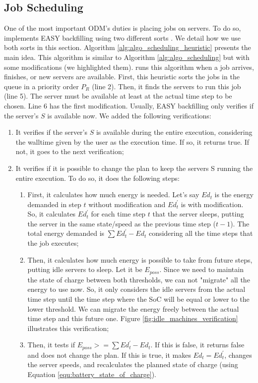\subsection{Job Scheduling}
\label{sec:model_easy}

One of the most important ODM's duties is placing jobs on servers. To do so, \emph{\systemName} implements EASY backfilling using two different sorts \cite{mu2001utilization, lelong2018tuning}. We detail how we use both sorts in this section. Algorithm \ref{alg:algo_scheduling_heuristic} presents the main idea. This algorithm is similar to Algorithm \ref{alg:algo_scheduling} but with some modifications (we highlighted them). \emph{\systemName} runs this algorithm when a job arrives, finishes, or new servers are available. First, this heuristic sorts the jobs in the queue in a priority order $P_{R}$ (line 2). Then, it finds the servers to run this job (line 5). The server must be available at least at the actual time step to be chosen. Line 6 has the first modification. Usually, EASY backfilling only verifies if the server's $S$ is available now. We added the following verifications:

\begin{enumerate}
    \item It verifies if the server's $S$ is available during the entire execution, considering the walltime given by the user as the execution time. If so, it returns true. If not, it goes to the next verification;
    \item It verifies if it is possible to change the plan to keep the servers S running the entire execution. To do so, it does the following steps:
    \begin{enumerate}
        \item First, it calculates how much energy is needed. Let's say $Ed_t$ is the energy demanded in step $t$ without modification and $Ed_t^{'}$ is with modification. So, it calculates $Ed_t^{'}$ for each time step $t$ that the server sleeps, putting the server in the same state/speed as the previous time step ($t-1$). The total energy demanded is $\sum Ed_t^{'} - Ed_t$ considering all the time steps that the job executes;
        \item Then, it calculates how much energy is possible to take from future steps, putting idle servers to sleep. Let it be $E_{poss}$. Since we need to maintain the state of charge between both thresholds, we can not "migrate" all the energy to use now. So, it only considers the idle servers from the actual time step until the time step where the SoC will be equal or lower to the lower threshold. We can migrate the energy freely between the actual time step and this future one. Figure \ref{fig:idle_machines_verification} illustrates this verification;
        \item Then, it tests if $E_{poss} >= \sum Ed_t^{'} - Ed_t$. If this is false, it returns false and does not change the plan. If this is true, it makes $Ed_t = Ed_t^{'}$, changes the server speeds, and recalculates the planned state of charge (using Equation \ref{equ:battery_state_of_charge}).
    \end{enumerate}
\end{enumerate}


